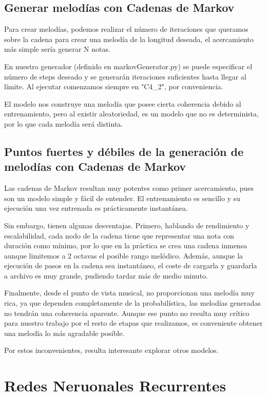     \subsection{Generar melodías con Cadenas de Markov}
    \label{subsec:generarCadenasMarkov}
    Para crear melodías, podemos realizar el número de iteraciones que queramos sobre la cadena para crear una melodía de la longitud deseada, el acercamiento más simple sería generar N notas. 
    
    En nuestro generador (definido en markovGenerator.py) se puede especificar el número de steps deseado y se generarán iteraciones suficientes hasta llegar al límite. Al ejecutar comenzamos siempre en "C4\_2", por conveniencia.

    El modelo nos construye una melodía que posee cierta coherencia debido al entrenamiento, pero al existir aleatoriedad, es un modelo que no es determinista, por lo que cada melodía será distinta.

    \subsection{Puntos fuertes y débiles de la generación de melodías con Cadenas de Markov}
    \label{subsec:ventajasYDesventajasMarkov}
    Las cadenas de Markov resultan muy potentes como primer acercamiento, pues son un modelo simple y fácil de entender. El entrenamiento es sencillo y su ejecución una vez entrenada es prácticamente instantánea.

    Sin embargo, tienen algunas desventajas. Primero, hablando de rendimiento y escalabilidad, cada nodo de la cadena tiene que representar una nota con duración como mínimo, por lo que en la práctica se crea una cadena inmensa aunque limitemos a 2 octavas el posible rango melódico. Además, aunque la ejecución de pasos en la cadena sea instantáneo, el coste de cargarla y guardarla a archivo es muy grande, pudiendo tardar más de medio minuto.

    Finalmente, desde el punto de vista musical, no proporcionan una melodía muy rica, ya que dependen completamente de la probabilística, las melodías generadas no tendrán una coherencia aparente. Aunque ese punto no resulta muy crítico para nuestro trabajo por el resto de etapas que realizamos, es conveniente obtener una melodía lo más agradable posible.

    Por estos inconvenientes, resulta interesante explorar otros modelos.

\section{Redes Neruonales Recurrentes}
\label{sec:RNR}
